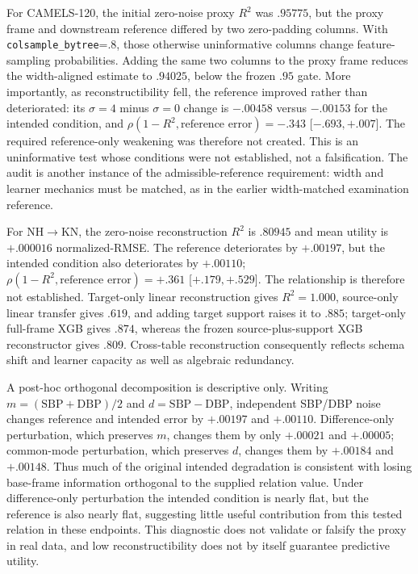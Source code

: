 
For CAMELS-120, the initial zero-noise proxy $R^2$ was $.95775$, but the proxy
frame and downstream reference differed by two zero-padding columns.  With
\texttt{colsample\_bytree}=.8, those otherwise uninformative columns change
feature-sampling probabilities.  Adding the same two columns to the proxy
frame reduces the width-aligned estimate to $.94025$, below the frozen $.95$
gate.  More importantly, as reconstructibility fell, the reference improved
rather than deteriorated: its $\sigma=4$ minus $\sigma=0$ change is $-.00458$
versus $-.00153$ for the intended condition, and
$\rho(1-R^2,\text{reference error})=-.343$ [$-.693,+.007$].  The required
reference-only weakening was therefore not created.  This is an uninformative
test whose conditions were not established, not a falsification.  The audit
is another instance of the admissible-reference requirement: width and
learner mechanics must be matched, as in the earlier width-matched examination
reference.

For NH$\rightarrow$KN, the zero-noise reconstruction $R^2$ is $.80945$ and
mean utility is $+.000016$ normalized-RMSE.  The reference deteriorates by
$+.00197$, but the intended condition also deteriorates by $+.00110$;
$\rho(1-R^2,\text{reference error})=+.361$ [$+.179,+.529$].  The relationship
is therefore not established.  Target-only linear reconstruction gives
$R^2=1.000$, source-only linear transfer gives $.619$, and adding target
support raises it to $.885$; target-only full-frame XGB gives $.874$, whereas
the frozen source-plus-support XGB reconstructor gives $.809$.  Cross-table
reconstruction consequently reflects schema shift and learner capacity as
well as algebraic redundancy.

A post-hoc orthogonal decomposition is descriptive only.  Writing
$m=(\mathrm{SBP}+\mathrm{DBP})/2$ and
$d=\mathrm{SBP}-\mathrm{DBP}$, independent SBP/DBP noise changes reference
and intended error by $+.00197$ and $+.00110$.  Difference-only perturbation,
which preserves $m$, changes them by only $+.00021$ and $+.00005$; common-mode
perturbation, which preserves $d$, changes them by $+.00184$ and $+.00148$.
Thus much of the original intended degradation is consistent with losing
base-frame information orthogonal to the supplied relation value.  Under
difference-only perturbation the intended condition is nearly flat, but the
reference is also nearly flat, suggesting little useful contribution from
this tested relation in these endpoints.  This diagnostic does not validate
or falsify the proxy in real data, and low reconstructibility does not by
itself guarantee predictive utility.

